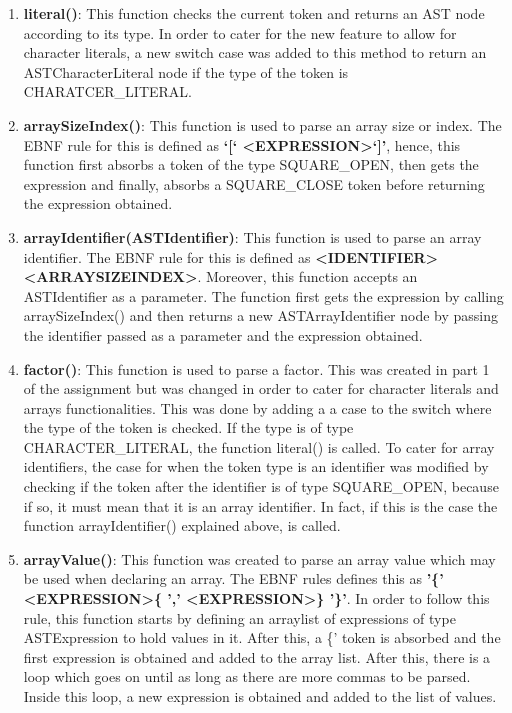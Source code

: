\documentclass{article}
\begin{document}
				\begin{enumerate}
				
				\item \textbf{literal()}: This function checks the current token and returns an AST node according to its type. In order to cater for the new feature to allow for character literals, a new switch case was added to this method to return an ASTCharacterLiteral node if the type of the token is CHARATCER\_LITERAL.
				
								\item \textbf{arraySizeIndex()}: This function is used to parse an array size or index. The EBNF rule for this is defined as \textbf{`[` \textless EXPRESSION\textgreater `]'}, hence, this function first absorbs a token of the type SQUARE\_OPEN, then gets the expression and finally, absorbs a SQUARE\_CLOSE token before returning the expression obtained.
								
				\item \textbf{arrayIdentifier(ASTIdentifier)}: This function is used to parse an array identifier. The EBNF rule for this is defined as \textbf{\textless IDENTIFIER\textgreater \textless ARRAYSIZEINDEX\textgreater}. Moreover, this function accepts an ASTIdentifier as a parameter. The function first gets the expression by calling arraySizeIndex() and then returns a new ASTArrayIdentifier node by passing the identifier passed as a parameter and the expression obtained.
				
\item \textbf{factor()}: This function is used to parse a factor. This was created in part 1 of the assignment but was changed in order to cater for character literals and arrays functionalities. This was done by adding a a case to the switch where the type of the token is checked. If the type is of type CHARACTER\_LITERAL, the function literal() is called. To cater for array identifiers, the case for when the token type is an identifier was modified by checking if the token after the identifier is of type SQUARE\_OPEN, because if so, it must mean that it is an array identifier. In fact, if this is the case the function arrayIdentifier() explained above, is called.
		
	\item \textbf{arrayValue()}: This function was created to parse an array value which may be used when declaring an array. The EBNF rules defines this as \textbf{'\{' \textless EXPRESSION\textgreater \{ ',' \textless EXPRESSION\textgreater \} '\}'}. In order to follow this rule, this function starts by defining an arraylist of expressions of type ASTExpression to hold values in it. After this, a \{' token is absorbed and the first expression is obtained and added to the array list. After this, there is a loop which goes on until as long as there are more commas to be parsed. Inside this loop, a new expression is obtained and added to the list of values. 
	

\end{enumerate}
\end{document}
